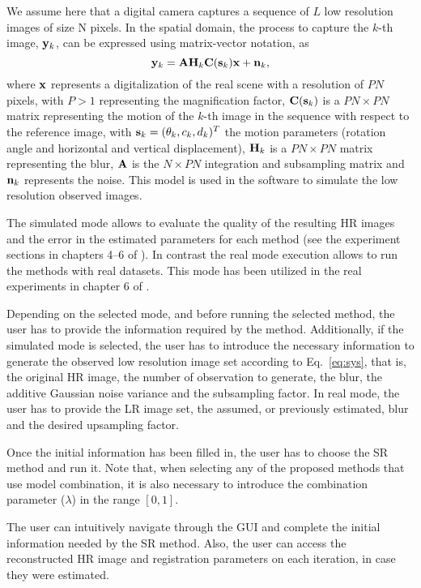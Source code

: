 \documentclass[11pt,a4paper]{article}
\newcommand{\bn}{{\bf n}}
\newcommand{\bx}{{\bf x}}
\newcommand{\bs}{{\bf s}}
\newcommand{\by}{{\bf y}}
\newcommand{\bC}{{\bf C}}
\newcommand{\bH}{{\bf H}}
\newcommand{\bA}{{\bf A}}
\begin{document}
We assume here that a digital camera captures a sequence of $L$ low resolution images of size N pixels. In the spatial domain, the process to capture the $k$-th image, $\by_k$, can be expressed using matrix-vector notation, as 
\begin{equation}
\by_{k} = \bA \bH_{k} \bC(\bs_{k}) \bx + \bn_{k},\label{eq:sys}
\end{equation}
where  $\bx$ represents a digitalization of the real scene with a resolution of $PN$ pixels, with $P>1$ representing the magnification factor, $\bC(\bs_{k})$ is a $PN \times PN$ matrix representing the motion of the $k$-th image in the sequence with respect to the reference image, with $\bs_k=(\theta_k,c_k,d_k)^T$ the motion parameters (rotation angle and horizontal and vertical displacement), $\bH_k$ is a $PN \times PN$ matrix representing the blur, $\bA$ is the $N \times PN$ integration and subsampling matrix and $\bn_k$ represents the noise. This model is used in the software to simulate the low resolution observed images.

The simulated mode allows to evaluate the quality of the resulting HR images and the error in the estimated parameters for each method (see the experiment sections in chapters 4--6 of \cite{VillenaThesis:11}). In contrast the real mode execution allows to run the methods with real datasets. This mode has been utilized in the real experiments in chapter 6 of \cite{VillenaThesis:11}.
 
Depending on the selected mode, and before running the selected method, the user has to provide the information required by the method. Additionally, if the simulated mode is selected, the user has to introduce the necessary information to generate the observed low resolution image set according to Eq.~\eqref{eq:sys}, that is, the original HR image, the number of observation to generate, the blur, the additive Gaussian noise variance and the subsampling factor. In real mode, the user has to provide the LR image set, the assumed, or previously estimated, blur and the desired upsampling factor. 

Once the initial information has been filled in, the user has to choose the SR method and run it. Note that, when selecting any of the proposed methods that use model combination, it is also necessary to introduce the combination parameter ($\lambda$) in the range $[0,1]$. 

The user can intuitively navigate through the GUI and complete the initial information needed by the SR method. Also, the user can access the reconstructed HR image and registration parameters on each iteration, in case they were estimated.
  
\end{document}
